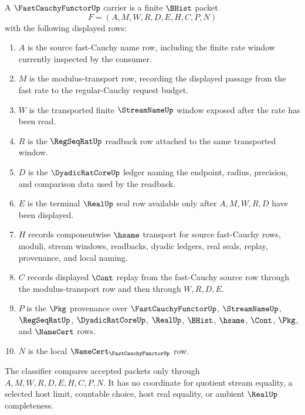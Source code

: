 \begin{definition}
\label{def:fast-cauchy-functor-carrier}
A $\FastCauchyFunctorUp$ carrier is a finite $\BHist$ packet
$$
F=(A,M,W,R,D,E,H,C,P,N)
$$
with the following displayed rows:
\begin{enumerate}
\item $A$ is the source fast-Cauchy name row, including the finite rate window currently inspected by the consumer.
\item $M$ is the modulus-transport row, recording the displayed passage from the fast rate to the regular-Cauchy request budget.
\item $W$ is the transported finite $\StreamNameUp$ window exposed after the rate has been read.
\item $R$ is the $\RegSeqRatUp$ readback row attached to the same transported window.
\item $D$ is the $\DyadicRatCoreUp$ ledger naming the endpoint, radius, precision, and comparison data used by the readback.
\item $E$ is the terminal $\RealUp$ seal row available only after $A,M,W,R,D$ have been displayed.
\item $H$ records componentwise $\hsame$ transport for source fast-Cauchy rows, moduli, stream windows, readbacks, dyadic ledgers, real seals, replay, provenance, and local naming.
\item $C$ records displayed $\Cont$ replay from the fast-Cauchy source row through the modulus-transport row and then through $W,R,D,E$.
\item $P$ is the $\Pkg$ provenance over $\FastCauchyFunctorUp$, $\StreamNameUp$, $\RegSeqRatUp$, $\DyadicRatCoreUp$, $\RealUp$, $\BHist$, $\hsame$, $\Cont$, $\Pkg$, and $\NameCert$ rows.
\item $N$ is the local $\NameCert_{\FastCauchyFunctorUp}$ row.
\end{enumerate}
The classifier compares accepted packets only through $A,M,W,R,D,E,H,C,P,N$. It has no coordinate for quotient stream equality, a selected host limit, countable choice, host real equality, or ambient $\RealUp$ completeness.
\end{definition}


